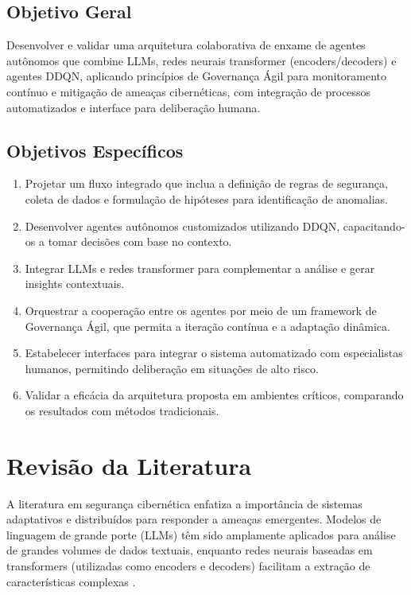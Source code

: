 \documentclass[article,12pt,a4paper]{abntex2}
\begin{document}
\subsection{Objetivo Geral}
Desenvolver e validar uma arquitetura colaborativa de enxame de agentes autônomos que combine LLMs, redes neurais transformer (encoders/decoders) e agentes DDQN, aplicando princípios de Governança Ágil para monitoramento contínuo e mitigação de ameaças cibernéticas, com integração de processos automatizados e interface para deliberação humana.

\subsection{Objetivos Específicos}
\begin{enumerate}
    \item Projetar um fluxo integrado que inclua a definição de regras de segurança, coleta de dados e formulação de hipóteses para identificação de anomalias.
    \item Desenvolver agentes autônomos customizados utilizando DDQN, capacitando-os a tomar decisões com base no contexto.
    \item Integrar LLMs e redes transformer para complementar a análise e gerar insights contextuais.
    \item Orquestrar a cooperação entre os agentes por meio de um framework de Governança Ágil, que permita a iteração contínua e a adaptação dinâmica.
    \item Estabelecer interfaces para integrar o sistema automatizado com especialistas humanos, permitindo deliberação em situações de alto risco.
    \item Validar a eficácia da arquitetura proposta em ambientes críticos, comparando os resultados com métodos tradicionais.
\end{enumerate}

\section{Revisão da Literatura}
A literatura em segurança cibernética enfatiza a importância de sistemas adaptativos e distribuídos para responder a ameaças emergentes. Modelos de linguagem de grande porte (LLMs) têm sido amplamente aplicados para análise de grandes volumes de dados textuais, enquanto redes neurais baseadas em transformers (utilizadas como encoders e decoders) facilitam a extração de características complexas \cite{mnih2015,suttonbarto2018}.
\end{document}
